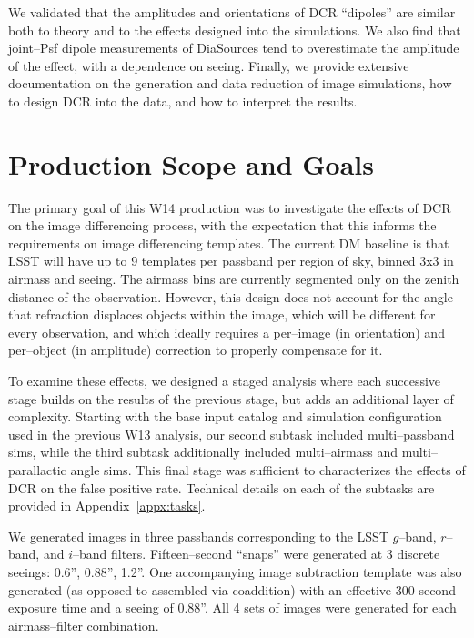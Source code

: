 \documentclass[DM,toc]{lsstdoc}
\begin{document}
We validated that the amplitudes and orientations of DCR ``dipoles''
are similar both to theory and to the effects designed into the
simulations.  We also find that joint--Psf dipole measurements of
DiaSources tend to overestimate the amplitude of the effect, with a
dependence on seeing.  Finally, we provide extensive documentation on
the generation and data reduction of image simulations, how to design
DCR into the data, and how to interpret the results.

\section{Production Scope and Goals}

The primary goal of this W14 production was to investigate the effects
of DCR on the image differencing process, with the expectation that
this informs the requirements on image differencing templates.  The
current DM baseline is that LSST will have up to 9 templates per
passband per region of sky, binned 3x3 in airmass and seeing.  The
airmass bins are currently segmented only on the zenith distance of
the observation.  However, this design does not account for the angle
that refraction displaces objects within the image, which will be
different for every observation, and which ideally requires a
per--image (in orientation) and per--object (in amplitude) correction
to properly compensate for it.

To examine these effects, we designed a staged analysis where each
successive stage builds on the results of the previous stage, but adds
an additional layer of complexity.  Starting with the base input
catalog and simulation configuration used in the previous W13
analysis, our second subtask included multi--passband sims, while the
third subtask additionally included multi--airmass and
multi--parallactic angle sims.  This final stage was sufficient to
characterizes the effects of DCR on the false positive rate.
Technical details on each of the subtasks are provided in
Appendix~\ref{appx:tasks}.

We generated images in three passbands corresponding to the LSST
$g$--band, $r$--band, and $i$--band filters.  Fifteen--second
``snaps'' were generated at 3 discrete seeings: 0.6'', 0.88'', 1.2''.
One accompanying image subtraction template was also generated (as
opposed to assembled via coaddition) with an effective 300 second
exposure time and a seeing of 0.88''.  All 4 sets of images were
generated for each airmass--filter combination.
\end{document}
